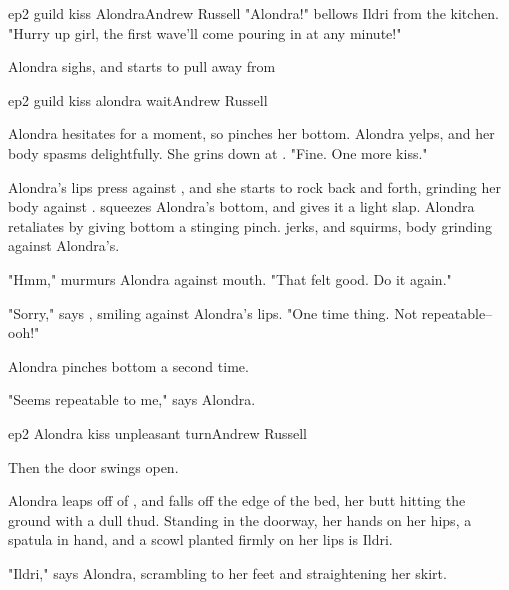 \documentclass{book}
\begin{document}
\begin{childnode}{ep2 guild kiss Alondra}{Andrew Russell}
    "Alondra!" bellows Ildri from the kitchen. "Hurry up girl, the first wave'll come pouring in at any minute!"

    Alondra sighs, and starts to pull away from \name{}



\end{childnode}

\begin{childnode}{ep2 guild kiss alondra wait}{Andrew Russell}


    Alondra hesitates for a moment, so \name{} pinches her bottom. Alondra yelps, and her body spasms delightfully. She grins down at \name{}. "Fine. One more kiss."

    Alondra's lips press against \names{}, and she starts to rock back and forth, grinding her body against \names{}. \name{} squeezes Alondra's bottom, and gives it a light slap. Alondra retaliates by
    giving \names{} bottom a stinging pinch. \name{} jerks, and squirms, \hisher{} body grinding against Alondra's.

    "Hmm," murmurs Alondra against \names{} mouth. "That felt good. Do it again."

    "Sorry," says \name{}, smiling against Alondra's lips. "One time thing. Not repeatable--ooh!"

    Alondra pinches \names{} bottom a second time.

    "Seems repeatable to me," says Alondra.


\end{childnode}

\begin{childnode}{ep2 Alondra kiss unpleasant turn}{Andrew Russell}

    Then the door swings open.

    Alondra leaps off of \name{}, and falls off the edge of the bed, her butt hitting the ground with a dull thud. Standing in the doorway, her hands on her hips, a spatula in hand, and a scowl planted firmly on her lips is Ildri.

    "Ildri," says Alondra, scrambling to her feet and straightening her skirt. 



\end{childnode}
\end{document}
